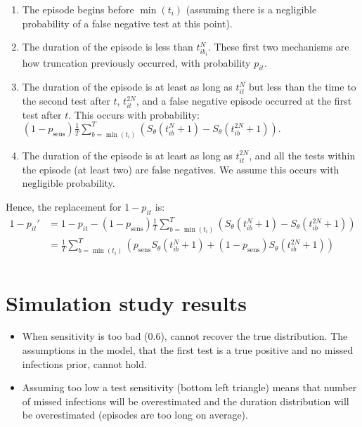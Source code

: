 \documentclass[thesis.tex]{subfiles}
\begin{document}
\begin{enumerate}
\item
  The episode begins before $\min(t_i)$ (assuming there is a
  negligible probability of a false negative test at this point).
\item
  The duration of the episode is less than $t_{ib_i}^N$. These first
  two mechanisms are how truncation previously occurred, with
  probability $p_{it}$.
\item
  The duration of the episode is at least as long as $t_{it}^N$ but
  less than the time to the second test after $t$, $t_{it}^{2N}$,
  and a false negative episode occurred at the first test after $t$.
  This occurs with probability:
  \begin{math}
    (1 - p_\text{sens})\frac{1}{T} \sum_{b=\min(t_i)}^T \left( S_\theta(t_{ib}^N + 1) - S_\theta(t_{ib}^{2N} + 1)\right).
  \end{math}
\item
  The duration of the episode is at least as long as $t_{it}^{2N}$,
  and all the tests within the episode (at least two) are false
  negatives. We assume this occurs with negligible probability.
\end{enumerate}

Hence, the replacement for $1 - p_{it}$ is:
\begin{align}
1 - p_{it}'
&= 1 - p_{it} - (1 - p_\text{sens})\frac{1}{T} \sum_{b=\min(t_i)}^T \left( S_\theta(t_{ib}^N + 1) - S_\theta(t_{ib}^{2N} + 1)\right) \\
&= \frac{1}{T} \sum_{b=\min(t_i)}^T \left( p_\text{sens} S_\theta(t_{ib}^N + 1) + (1 - p_\text{sens}) S_\theta(t_{ib}^{2N} + 1)\right) \\
\end{align}

\section{Simulation study results} \label{imperf-test:sec:sim-study-results}

\begin{itemize}
  \item When sensitivity is too bad (0.6), cannot recover the true distribution. The assumptions in the model, that the first test is a true positive and no missed infections prior, cannot hold.
  \item Assuming too low a test sensitivity (bottom left triangle) means that number of missed infections will be overestimated and the duration distribution will be overestimated (\ie episodes are too long on average).
\end{itemize}
\end{document}
